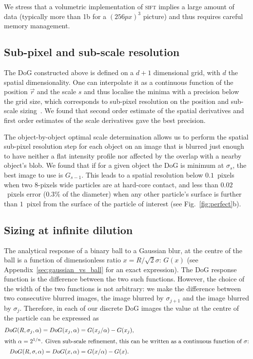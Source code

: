 \documentclass[8.5pt,twoside,twocolumn]{article}
\begin{document}
We stress that a volumetric implementation of \textsc{sift} implies a large amount of data (typically more than \unit{1}{\giga b} for a $(\unit{256}{px})^3$ picture) and thus requires careful memory management.

\subsection*{Sub-pixel and sub-scale resolution}
The DoG constructed above is defined on a $d+1$ dimensional grid, with $d$ the spatial dimensionality. One can interpolate it as a continuous function of the position $\vec{r}$ and the scale $s$ and thus localise the minima with a precision below the grid size, which corresponds to sub-pixel resolution on the position and sub-scale sizing~\citep{Lowe2004}. We found that second order estimate of the spatial derivatives and first order estimates of the scale derivatives gave the best precision.

The object-by-object optimal scale determination allows us to perform the spatial sub-pixel resolution step for each object on an image that is blurred just enough to have neither a flat intensity profile nor affected by the overlap with a nearby object's blob. We found that if for a given object the DoG is minimum at $\sigma_s$, the best image to use is $G_{s-1}$. This leads to a spatial resolution below $0.1$~pixels when two $8$-pixels wide particles are at hard-core contact, and less than $0.02$~pixels error ($0.3\%$ of the diameter) when any other particle's surface is further than $1$~pixel from the surface of the particle of interest (see Fig.~\ref{fig:perfect}b).

\subsection*{Sizing at infinite dilution}

The analytical response of a binary ball to a Gaussian blur, at the centre of the ball is a function of dimensionless ratio $x=R/\sqrt{2}\sigma$: $G(x)$ (see Appendix~\ref{sec:gaussian_vs_ball} for an exact expression). The DoG response function is the difference between the two such functions. However, the choice of the width of the two functions is not arbitrary: we make the difference between two consecutive blurred images, the image blurred by $\sigma_{j+1}$ and the image blurred by $\sigma_j$. Therefore, in each of our discrete DoG images the value at the centre of the particle can be expressed as
\begin{align}
DoG(R,\sigma_j, \alpha) = DoG(x_j, \alpha) &= G(x_j/\alpha) - G(x_j),\\
\intertext{with $\alpha=2^{1/n}$. Given sub-scale refinement, this can be written as a continuous function of $\sigma$:}
DoG(R,\sigma, \alpha) = DoG(x, \alpha) &= G(x/\alpha) - G(x).
\end{align}
\end{document}
